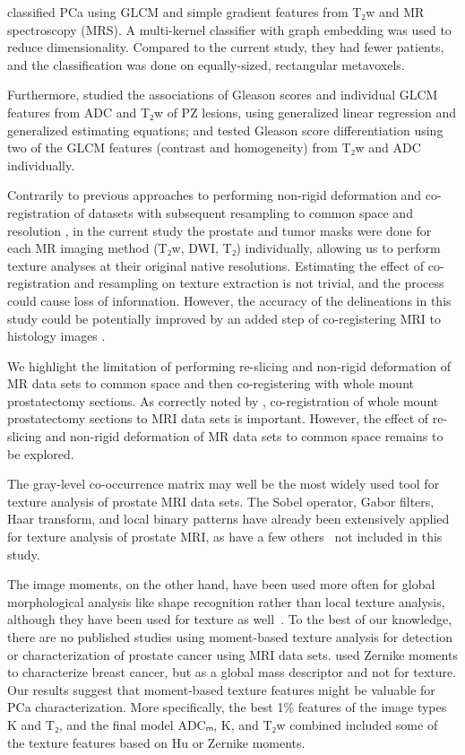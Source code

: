 \citet{Tiwari2013} classified PCa using GLCM and simple gradient features from
T₂w and MR spectroscopy (MRS). A multi-kernel classifier with graph embedding
was used to reduce dimensionality. Compared to the current study, they had fewer
patients, and the classification was done on equally-sized, rectangular
metavoxels.

Furthermore, \citet{Wibmer2015} studied the associations of Gleason scores and
individual GLCM features from ADC and T₂w of PZ lesions, using generalized
linear regression and generalized estimating equations; and \citet{Vignati2015}
tested Gleason score differentiation using two of the GLCM features (contrast
and homogeneity) from T₂w and ADC individually.

Contrarily to previous approaches to performing non-rigid deformation and
co-registration of datasets with subsequent resampling to common space and
resolution \citep{Viswanath2012, Ginsburg2014}, in the current study the
prostate and tumor masks were done for each MR imaging method (T₂w, DWI, T₂)
individually, allowing us to perform texture analyses at their original native
resolutions. Estimating the effect of co-registration and resampling on texture
extraction is not trivial, and the process could cause loss of information.
However, the accuracy of the delineations in this study could be potentially
improved by an added step of co-registering MRI to histology images
\citep{Bourne2017}.

We highlight the limitation of performing re-slicing and
non-rigid deformation of MR data sets to common space and then co-registering
with whole mount prostatectomy sections. As correctly noted by
\citet{Bourne2017}, co-registration of whole mount prostatectomy sections to MRI
data sets is important. However, the effect of re-slicing and non-rigid
deformation of MR data sets to common space remains to be explored.

The gray-level co-occurrence matrix may well be the most widely used tool for
texture analysis of prostate MRI data sets. The Sobel operator, Gabor filters,
Haar transform, and local binary patterns have already been extensively applied
for texture analysis of prostate MRI, as have a few others~\citep{Lemaitre2015}
not included in this study.

The image moments, on the other hand, have been used more often for global
morphological analysis like shape recognition rather than local texture
analysis, although they have been used for texture as well~\citep{Tuceryan1994,
Laws1980, Tuceryan1990}. To the best of our knowledge, there are no published
studies using moment-based texture analysis for detection or characterization of
prostate cancer using MRI data sets. \citet{Tahmasbi2011} used Zernike moments
to characterize breast cancer, but as a global mass descriptor and not for
texture. Our results suggest that moment-based texture features might be
valuable for PCa characterization. More specifically, the best 1\% features of
the image types K and T₂, and the final model ADCₘ, K, and T₂w combined
included some of the texture features based on Hu or Zernike moments.

